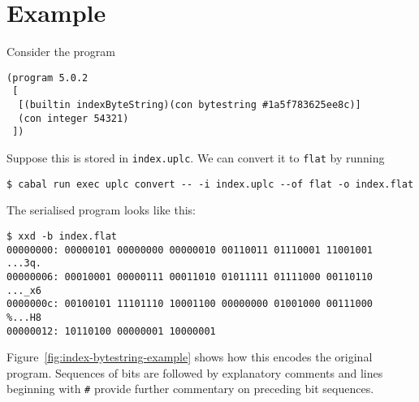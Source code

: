 \section{Example}
Consider the program
\begin{verbatim}
(program 5.0.2
 [
  [(builtin indexByteString)(con bytestring #1a5f783625ee8c)]
  (con integer 54321)
 ])
\end{verbatim}

\noindent Suppose this is stored in \texttt{index.uplc}.  We can convert it to
\texttt{flat} by running
\begin{verbatim}
$ cabal run exec uplc convert -- -i index.uplc --of flat -o index.flat
\end{verbatim}

\noindent The serialised program looks like this:

{\small
\begin{verbatim}
$ xxd -b index.flat
00000000: 00000101 00000000 00000010 00110011 01110001 11001001  ...3q.
00000006: 00010001 00000111 00011010 01011111 01111000 00110110  ..._x6
0000000c: 00100101 11101110 10001100 00000000 01001000 00111000  %...H8
00000012: 10110100 00000001 10000001
\end{verbatim}
}

\noindent Figure~\ref{fig:index-bytestring-example} shows how this encodes the
original program.  Sequences of bits are followed by explanatory comments and
lines beginning with \texttt{\#} provide further commentary on preceding bit
sequences.

\newcommand{\arrow}{$\rightarrow$}

